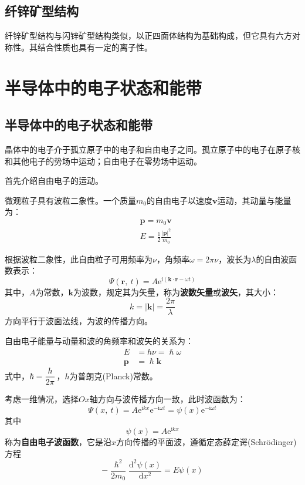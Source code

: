 \subsection{纤锌矿型结构}

纤锌矿型结构与闪锌矿型结构类似，以正四面体结构为基础构成，但它具有六方对称性。其结合性质也具有一定的离子性。

\section{半导体中的电子状态和能带}

\subsection{半导体中的电子状态和能带}

晶体中的电子介于孤立原子中的电子和自由电子之间。孤立原子中的电子在原子核和其他电子的势场中运动；自由电子在零势场中运动。

首先介绍自由电子的运动。

微观粒子具有波粒二象性。一个质量$m_0$的自由电子以速度$\bm v$运动，其动量与能量为：
\begin{align}
    &\bm p=m_0 \bm v\label{eq:free_momentum}\\
    &E=\frac{1}{2}\frac{\left|\bm p\right|^2}{m_0}\label{eq:free_energy}
\end{align}

根据波粒二象性，此自由粒子可用频率为$\nu$，角频率$\omega=2\pi\nu$，波长为$\lambda$的自由波函数表示：
\begin{equation}
    \Psi\left(\bm r,\ t\right)=A\mathrm{e}^{\mathrm{i}\left(\bm k\cdot\bm r-\omega t\right)}
\end{equation}
其中，$A$为常数，$\bm k$为波数，规定其为矢量，称为\textbf{波数矢量}或\textbf{波矢}，其大小：
\begin{equation}
    k=\left|\bm k\right|=\frac{2\pi}{\lambda}
\end{equation}
方向平行于波面法线，为波的传播方向。

自由电子能量与动量和波的角频率和波矢的关系为：
\begin{align}
    E&=h\nu=\hslash\omega\label{eq:free_energy_wave}\\
    \bm p&=\hslash\bm k\label{eq:free_momentum_wave}
\end{align}
式中，$\hslash=\displaystyle\frac{h}{2\pi}$，$h$为普朗克(Planck)常数。

\vspace{1ex}考虑一维情况，选择$Ox$轴方向与波传播方向一致，此时波函数为：
\begin{equation}
    \Psi(x,\ t)=A\mathrm{e}^{\mathrm{i}kx}\mathrm{e}^{-\mathrm{i}\omega t}=\psi(x)\mathrm{e}^{-\mathrm{i}\omega t}
\end{equation}
其中
\begin{equation}
    \psi(x)=A\mathrm{e}^{\mathrm{i}kx}
\end{equation}
称为\textbf{自由电子波函数}，它是沿$x$方向传播的平面波，遵循定态薛定谔(Schr\"odinger)方程
\begin{equation}
    -\frac{\hslash^2}{2m_0}\frac{\mathrm{d}^2\psi(x)}
    {\mathrm{d}x^2}=E\psi(x)
\end{equation}


